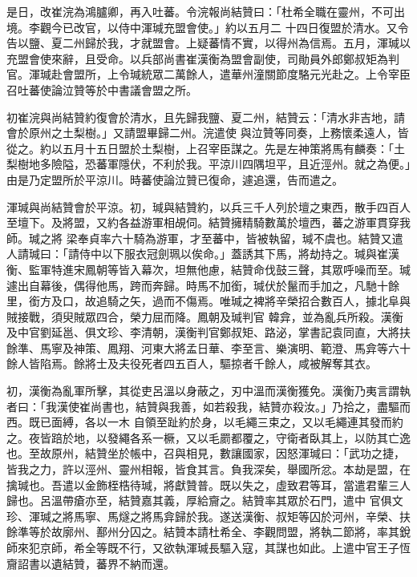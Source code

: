 \begin{pinyinscope}
 是日，改崔浣為鴻臚卿，再入吐蕃。令浣報尚結贊曰：「杜希全職在靈州，不可出境。李觀今已改官，以侍中渾瑊充盟會使。」約以五月二
 十四日復盟於清水。又令告以鹽、夏二州歸於我，才就盟會。上疑蕃情不實，以得州為信焉。五月，渾瑊以充盟會使來辭，且受命。以兵部尚書崔漢衡為盟會副使，司勛員外郎鄭叔矩為判官。渾瑊赴會盟所，上令瑊統眾二萬餘人，遣華州潼關節度駱元光赴之。上令宰臣召吐蕃使論泣贊等於中書議會盟之所。



 初崔浣與尚結贊約復會於清水，且先歸我鹽、夏二州，結贊云：「清水非吉地，請會於原州之土梨樹。」又請盟畢歸二州。浣遣使
 與泣贊等同奏，上務懷柔遠人，皆從之。約以五月十五日盟於土梨樹，上召宰臣謀之。先是左神策將馬有麟奏：「土梨樹地多險隘，恐蕃軍隱伏，不利於我。平涼川四隅坦平，且近涇州。就之為便。」由是乃定盟所於平涼川。時蕃使論泣贊已復命，遽追還，告而遣之。



 渾瑊與尚結贊會於平涼。初，瑊與結贊約，以兵三千人列於壇之東西，散手四百人至壇下。及將盟，又約各益游軍相覘伺。結贊擁精騎數萬於壇西，蕃之游軍貫穿我師。瑊之將
 梁奉貞率六十騎為游軍，才至蕃中，皆被執留，瑊不虞也。結贊又遣人請瑊曰：「請侍中以下服衣冠劍珮以俟命。」蓋誘其下馬，將劫持之。瑊與崔漢衡、監軍特進宋鳳朝等皆入幕次，坦無他慮，結贊命伐鼓三聲，其眾呼噪而至。瑊遽出自幕後，偶得他馬，跨而奔歸。時馬不加銜，瑊伏於鬣而手加之，凡馳十餘里，銜方及口，故追騎之矢，過而不傷焉。唯瑊之裨將辛榮招合數百人，據北阜與賊接戰，須臾賊眾四合，榮力屈而降。鳳朝及瑊判官
 韓弇，並為亂兵所殺。漢衡及中官劉延邕、俱文珍、李清朝，漢衡判官鄭叔矩、路泌，掌書記袁同直，大將扶餘準、馬寧及神策、鳳翔、河東大將孟日華、李至言、樂演明、範澄、馬弇等六十餘人皆陷焉。餘將士及夫役死者四五百人，驅掠者千餘人，咸被解奪其衣。



 初，漢衡為亂軍所擊，其從吏呂溫以身蔽之，刃中溫而漢衡獲免。漢衡乃夷言謂執者曰：「我漢使崔尚書也，結贊與我善，如若殺我，結贊亦殺汝。」乃拾之，盡驅而西。既已面縛，各以一木
 自領至趾約於身，以毛繩三束之，又以毛繩連其發而約之。夜皆踣於地，以發繩各系一橛，又以毛罽都覆之，守衛者臥其上，以防其亡逸也。至故原州，結贊坐於帳中，召與相見，數讓國家，因怒渾瑊曰：「武功之捷，皆我之力，許以涇州、靈州相報，皆食其言。負我深矣，舉國所忿。本劫是盟，在擒瑊也。吾遣以金飾桎梏待瑊，將獻贊普。既以失之，虛致君等耳，當遣君輩三人歸也。呂溫帶瘡亦至，結贊嘉其義，厚給齎之。結贊率其眾於石門，遣中
 官俱文珍、渾瑊之將馬寧、馬燧之將馬弇歸於我。遂送漢衡、叔矩等囚於河州，辛榮、扶餘準等於故廓州、鄯州分囚之。結贊本請杜希全、李觀問盟，將執二節將，率其銳師來犯京師，希全等既不行，又欲執渾瑊長驅入寇，其謀也如此。上遣中官王子恆齎詔書以遺結贊，蕃界不納而還。




\end{pinyinscope}

